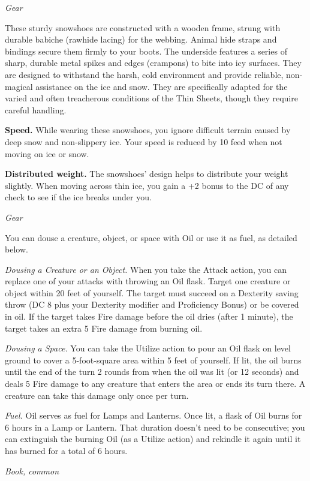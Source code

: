 \documentclass[
  letterpaper,12pt,twoside,twocolumn,openany,
  nodeprecatedcode,bg=full]{dndbook}
\begin{document}
{\emph{Gear}}

These sturdy snowshoes are constructed with a wooden frame, strung with
durable babiche (rawhide lacing) for the webbing. Animal hide straps and
bindings secure them firmly to your boots. The underside features a
series of sharp, durable metal spikes and edges (crampons) to bite into
icy surfaces. They are designed to withstand the harsh, cold environment
and provide reliable, non-magical assistance on the ice and snow. They
are specifically adapted for the varied and often treacherous conditions
of the Thin Sheets, though they require careful handling.

\textbf{Speed.} While wearing these snowshoes, you ignore difficult
terrain caused by deep snow and non-slippery ice. Your speed is reduced
by 10 feed when not moving on ice or snow.

\textbf{Distributed weight.} The snowshoes' design helps to distribute
your weight slightly. When moving across thin ice, you gain a +2 bonus
to the DC of any check to see if the ice breaks under you.

{\emph{Gear}}

You can douse a creature, object, or space with Oil or use it as fuel,
as detailed below.

\emph{Dousing a Creature or an Object.} When you take the Attack action,
you can replace one of your attacks with throwing an Oil flask. Target
one creature or object within 20 feet of yourself. The target must
succeed on a Dexterity saving throw (DC 8 plus your Dexterity modifier
and Proficiency Bonus) or be covered in oil. If the target takes Fire
damage before the oil dries (after 1 minute), the target takes an extra
5 Fire damage from burning oil.

\emph{Dousing a Space.} You can take the Utilize action to pour an Oil
flask on level ground to cover a 5-foot-square area within 5 feet of
yourself. If lit, the oil burns until the end of the turn 2 rounds from
when the oil was lit (or 12 seconds) and deals 5 Fire damage to any
creature that enters the area or ends its turn there. A creature can
take this damage only once per turn.

\emph{Fuel.} Oil serves as fuel for Lamps and Lanterns. Once lit, a
flask of Oil burns for 6 hours in a Lamp or Lantern. That duration
doesn't need to be consecutive; you can extinguish the burning Oil (as a
Utilize action) and rekindle it again until it has burned for a total of
6 hours.

{\emph{Book, common}}
\end{document}
